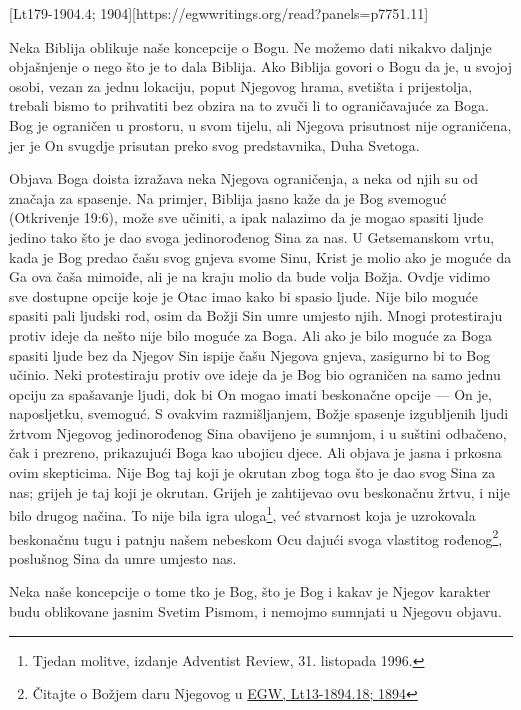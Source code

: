 [Lt179-1904.4; 1904][https://egwwritings.org/read?panels=p7751.11]

Neka Biblija oblikuje naše koncepcije o Bogu. Ne možemo dati nikakvo daljnje objašnjenje o  nego što je to dala Biblija. Ako Biblija govori o Bogu da je, u svojoj osobi, vezan za jednu lokaciju, poput Njegovog hrama, svetišta i prijestolja, trebali bismo to prihvatiti bez obzira na to zvuči li to ograničavajuće za Boga. Bog je ograničen u prostoru, u svom tijelu, ali Njegova prisutnost nije ograničena, jer je On svugdje prisutan preko svog predstavnika, Duha Svetoga.

Objava Boga doista izražava neka Njegova ograničenja, a neka od njih su od značaja za spasenje. Na primjer, Biblija jasno kaže da je Bog svemoguć (Otkrivenje 19:6), može sve učiniti, a ipak nalazimo da je mogao spasiti ljude jedino tako što je dao svoga jedinorođenog Sina za nas. U Getsemanskom vrtu, kada je Bog predao čašu svog gnjeva svome Sinu, Krist je molio ako je moguće da Ga ova čaša mimoiđe, ali je na kraju molio da bude volja Božja. Ovdje vidimo sve dostupne opcije koje je Otac imao kako bi spasio ljude. Nije bilo moguće spasiti pali ljudski rod, osim da Božji Sin umre umjesto njih. Mnogi protestiraju protiv ideje da nešto nije bilo moguće za Boga. Ali ako je bilo moguće za Boga spasiti ljude bez da Njegov Sin ispije čašu Njegova gnjeva, zasigurno bi to Bog učinio. Neki protestiraju protiv ove ideje da je Bog bio ograničen na samo jednu opciju za spašavanje ljudi, dok bi On mogao imati beskonačne opcije — On je, naposljetku, svemoguć. S ovakvim razmišljanjem, Božje spasenje izgubljenih ljudi žrtvom Njegovog jedinorođenog Sina obavijeno je sumnjom, i u suštini odbačeno, čak i prezreno, prikazujući Boga kao ubojicu djece. Ali objava je jasna i prkosna ovim skepticima. Nije Bog taj koji je okrutan zbog toga što je dao svog Sina za nas; grijeh je taj koji je okrutan. Grijeh je zahtijevao ovu beskonačnu žrtvu, i nije bilo drugog načina. To nije bila igra uloga\footnote{Tjedan molitve, izdanje Adventist Review, 31. listopada 1996.}, već stvarnost koja je uzrokovala beskonačnu tugu i patnju našem nebeskom Ocu dajući svoga vlastitog rođenog\footnote{Čitajte o Božjem daru Njegovog  u \href{https://egwwritings.org/?ref=en_Lt13-1894.18&para=5486.24}{{EGW, Lt13-1894.18; 1894}}}, poslušnog Sina da umre umjesto nas.

Neka naše koncepcije o tome tko je Bog, što je Bog i kakav je Njegov karakter budu oblikovane jasnim Svetim Pismom, i nemojmo sumnjati u Njegovu objavu.

